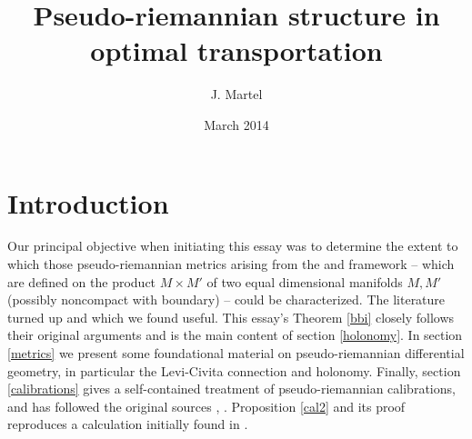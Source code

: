\documentclass[12pt]{amsart}
\title{Pseudo-riemannian structure in optimal transportation}
\date{March 2014}
\author{J. Martel}
\theoremstyle{definition}
\theoremstyle{remark}
\begin{document}
\maketitle


\section{Introduction} 



Our principal objective when initiating this essay was to determine the extent to which those pseudo-riemannian metrics arising from the \cite{KM} and \cite{KMW} framework -- which are defined on the product $M \times M'$ of two equal dimensional manifolds $M,M'$ (possibly noncompact with boundary) -- could be characterized. The literature turned up \cite{BBI} and \cite{T} which we found useful. This essay's Theorem \ref{bbi} closely follows their original arguments and is the main content of section \ref{holonomy}. In section \ref{metrics} we present some foundational material on pseudo-riemannian differential geometry, in particular the Levi-Civita connection and holonomy. Finally, section \ref{calibrations} gives a self-contained treatment of pseudo-riemannian calibrations, and has followed the original sources \cite{M}, \cite{W}. Proposition \ref{cal2} and its proof reproduces a calculation initially found in \cite{W}.  

\end{document}
